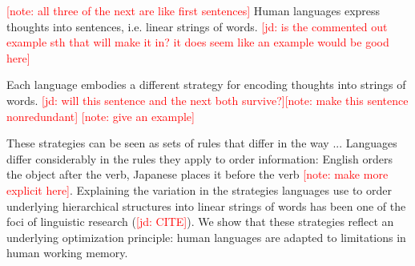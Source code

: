 \documentclass[12pt]{article}
\newcommand{\jd}[1]{\textcolor{Red}{[jd: #1]}}
\newcommand{\note}[1]{\textcolor{Red}{[note: #1]}}
\begin{document}





\note{all three of the next are like first sentences}
Human languages express thoughts into sentences, i.e. linear strings of words. 
\jd{is the commented out example sth that will make it in? it does seem like an example would be good here}

Each language embodies a different strategy for encoding thoughts into strings of words. \jd{will this sentence and the next both survive?}\note{make this sentence nonredundant}
\note{give an example}

These strategies can be seen as sets of rules that differ in the way ...
Languages differ considerably in the rules they apply to order information: English orders the object after the verb, Japanese places it before the verb \note{make more explicit here}.
Explaining the variation in the strategies languages use to  order underlying hierarchical structures into linear strings of words has been one of the foci of linguistic research (\jd{CITE}).
We show that these strategies reflect an underlying optimization principle: human languages are adapted to limitations in human working memory.
\end{document}
